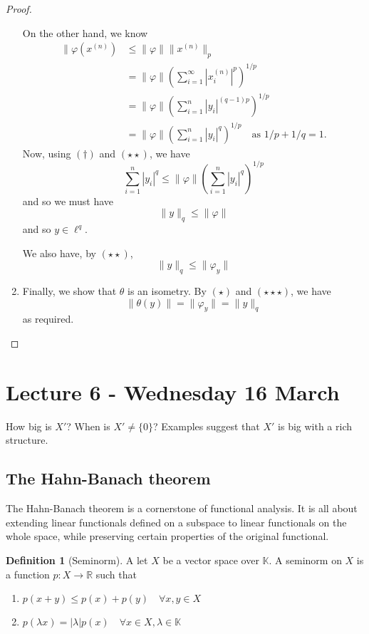 \documentclass[10pt, oneside, reqno]{amsart}
\theoremstyle{plain}%
\theoremstyle{definition}
\newtheorem{defn}[thm]{Definition}
\theoremstyle{remark}
\newcommand{\R}{\mathbb{R}}
\newcommand{\K}{\mathbb{K}}
\renewcommand{\phi}{\varphi}
\begin{document}
\begin{proof}
\begin{enumerate}[(1)]
        On the other hand, we know \begin{align*}
            \| \phi( x^{(n)}) &\leq \| \phi \| \| x^{(n)} \|_p \\
                            &= \| \phi \| \left( \sum_{i=1}^\infty |x_i^{(n)}|^p \right)^{1/p} \\
                            &= \| \phi \| \left( \sum_{i = 1}^n |y_i |^{(q-1)p} \right)^{1/p} \\
                            &= \| \phi \| \left( \sum_{i=1}^n |y_i |^q \right)^{1/p} \quad \text{as $1/p + 1/q = 1$.} \tag{$\star \star$}
        \end{align*}
        Now, using $(\dagger)$ and $(\star \star)$, we have \[
             \sum_{i=1}^n |y_i|^q  \leq \| \phi \| \left( \sum_{i=1}^n | y_i |^q \right)^{1/p} 
        \] and so we must have \[
            \| y \|_q \leq \| \phi \| \tag{$\star \star \star$}
        \]
        and so $y \in \ell^q$.
        
        We also have, by $(\star \star)$,\[
            \| y \|_q \leq \| \phi_y \|
        \] 
        \item Finally, we show that $\theta$ is an isometry.  By $(\star)$ and $(\star \star \star)$, we have \[
            \| \theta(y) \| = \| \phi_y \| = \| y \|_q 
        \] as required.\qedhere
         
    \end{enumerate} 
\end{proof} 

\section{Lecture 6 - Wednesday 16 March} %
\label{sec:lecture_6_wednesday_16_march}
How big is $X'$?  When is $X' \neq \{ 0 \}$?  Examples suggest that $X'$ is big with a rich structure.  

\subsection{The Hahn-Banach theorem} %
\label{sub:the_hahn_banach_theorem}
The Hahn-Banach theorem is a cornerstone of functional analysis.  It is all about extending linear functionals defined on a subspace to linear functionals on the whole space, while preserving certain properties of the original functional.

\begin{defn}[Seminorm]
A let $X$ be a vector space over $\K$.  A seminorm on $X$ is a function $p : X \rightarrow \R$ such that 
\begin{enumerate}[(1)]
    \item $p(x+y) \leq p(x) + p(y) \quad \forall x,y \in X$
    \item $p(\lambda x) = | \lambda | p(x) \quad \forall x \in X, \lambda \in \K$
\end{enumerate}
\end{defn}
\end{document}
